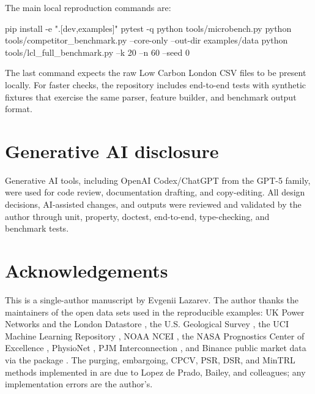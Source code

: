 \documentclass[article]{jdssv}
\newcommand{\pcv}{\pkg{purgedcv}}
\begin{document}
The main local reproduction commands are:

\begin{Code}
pip install -e ".[dev,examples]"
pytest -q
python tools/microbench.py
python tools/competitor_benchmark.py --core-only --out-dir examples/data
python tools/lcl_full_benchmark.py --k 20 --n 60 --seed 0
\end{Code}

The last command expects the raw Low Carbon London CSV files to be present
locally. For faster checks, the repository includes end-to-end tests with
synthetic fixtures that exercise the same parser, feature builder, and
benchmark output format.

\section*{Generative AI disclosure}

Generative AI tools, including OpenAI Codex/ChatGPT from the GPT-5 family, were
used for code review, documentation drafting, and copy-editing. All design
decisions, AI-assisted changes, and outputs were reviewed and validated by the
author through unit, property, doctest, end-to-end, type-checking, and benchmark
tests.

\section*{Acknowledgements}

This is a single-author manuscript by Evgenii Lazarev. The author thanks the
maintainers of the open data sets used in the reproducible examples: UK Power
Networks and the London Datastore \citep{ukpn_lcl}, the U.S. Geological Survey
\citep{usgs_catalog}, the UCI Machine Learning Repository
\citep{devito2008airquality}, NOAA NCEI \citep{noaa_ghcnd}, the NASA
Prognostics Center of Excellence \citep{nasa_cmapss}, PhysioNet
\citep{physionet2012goldberger,physionet2012silva}, PJM Interconnection
\citep{pjm_load}, and Binance public market data via the  package
\citep{binance_pricehub}. The purging, embargoing, CPCV, PSR, DSR, and MinTRL
methods implemented in \pcv{} are due to Lopez de Prado, Bailey, and
colleagues; any implementation errors are the author's.


\end{document}

